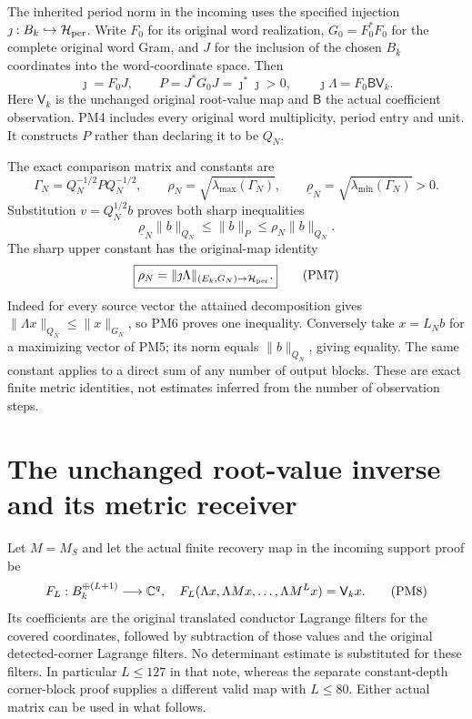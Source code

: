 The inherited period norm in the incoming
uses the specified injection $\jmath:B_k\hookrightarrow\mathcal H_{\rm per}$.
Write $F_0$ for its original word realization, $G_0=F_0^*F_0$ for
the complete original word Gram, and $J$ for the inclusion of
the chosen $B_k$ coordinates into the word-coordinate space.
Then
\[
 \jmath=F_0J,\qquad P=J^*G_0J=\jmath^*\jmath>0,
 \qquad\jmath\Lambda=F_0\mathsf B\mathsf V_k.                   \tag{PM4}
\]
Here $\mathsf V_k$ is the unchanged original root-value map and
$\mathsf B$ the actual coefficient observation.  PM4 includes
every original word multiplicity, period entry and unit.  It
constructs $P$ rather than declaring it to be $Q_N$.

The exact comparison matrix and constants are
\[
 \Gamma_N=Q_N^{-1/2}P Q_N^{-1/2},\qquad
 \rho_N=\sqrt{\lambda_{\max}(\Gamma_N)},\qquad
 \underline\rho_N=\sqrt{\lambda_{\min}(\Gamma_N)}>0.             \tag{PM5}
\]
Substitution $v=Q_N^{1/2}b$ proves both sharp inequalities
\[
 \underline\rho_N\|b\|_{Q_N}\le\|b\|_P
                         \le\rho_N\|b\|_{Q_N}.                 \tag{PM6}
\]
The sharp upper constant has the original-map identity
\[
 \boxed{\rho_N=\|\jmath\Lambda\|_{(E_k,G_N)\to\mathcal H_{\rm per}}.}
                                                                    \tag{PM7}
\]
Indeed for every source vector the attained decomposition gives
$\|\Lambda x\|_{Q_N}\le\|x\|_{G_N}$, so PM6 proves one
inequality.  Conversely take $x=L_Nb$ for a maximizing vector of
PM5; its norm equals $\|b\|_{Q_N}$, giving equality.  The same
constant applies to a direct sum of any number of output blocks.
These are exact finite metric identities, not estimates inferred
from the number of observation steps.

\section{The unchanged root-value inverse and its metric receiver}
Let $M=M_S$ and let the actual finite recovery map in the incoming
support proof be
\[
 F_L:B_k^{\oplus(L+1)}\longrightarrow\mathbb C^q,
 \quad F_L(\Lambda x,\Lambda Mx,\ldots,\Lambda M^Lx)
                                  =\mathsf V_kx.               \tag{PM8}
\]
Its coefficients are the original translated conductor Lagrange
filters for the covered coordinates, followed by subtraction of
those values and the original detected-corner Lagrange filters.
No determinant estimate is substituted for these filters.
In particular $L\le127$ in that note, whereas the separate
constant-depth corner-block proof supplies a different valid map
with $L\le80$.  Either actual matrix can be used in what follows.

